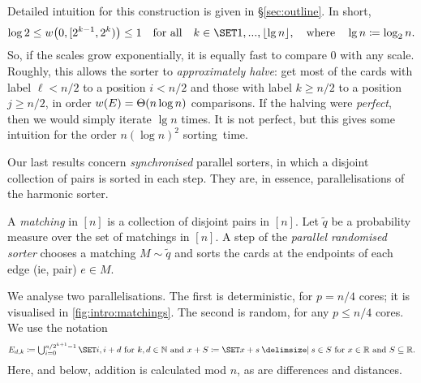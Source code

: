 \documentclass{article}
\begin{document}
\begin{rmkt}
\label{rmk:intro:harm}
Detailed intuition for this construction is given in \S\ref{sec:outline}.
In short,
\[
	\log 2
\le
	w\rbb{ 0, \coi{2^{k-1}, 2^k} }
\le
	1
\Qforall
	k \in \set{1, ..., \floor{\lg n}},
\Qwhere
	\lg n \cq \log_2 n.
\]
So, if the scales grow exponentially, it is equally fast to compare $0$ with any scale.
Roughly, this allows the sorter to \textit{approximately halve}:
	get most of the cards with label $\ell < n/2$ to a position $i < n/2$ and those with label $k \ge n/2$ to a position $j \ge n/2$, in order $w(E) = \Theta( n \log n )$ comparisons.
If the halving were \textit{perfect}, then we would simply iterate $\lg n$ times.
It is not perfect, but this gives some intuition for the order $n (\log n)^2$ sorting~time.
\end{rmkt}


Our last results concern \emph{synchronised} parallel sorters, in which a disjoint collection of pairs is sorted in each step. They are, in essence, parallelisations of the harmonic sorter.

\begin{defn}
\label{def:intro:par}
A \textit{matching} in $[n]$ is a collection of disjoint pairs in $[n]$.
Let $\tilde q$ be a probability measure over the set of matchings in $[n]$.
A step of the \textit{parallel randomised sorter} chooses a matching $M \sim \tilde q$ and sorts the cards at the endpoints of each edge (ie, pair) $e \in M$.
\end{defn}

We analyse two parallelisations.
	The first is deterministic, for $p = n/4$ cores; it is visualised in \cref{fig:intro:matchings}.
	The second is random, for any $p \le n/4$ cores.
We use the notation
\[
\textstyle
	E_{d,k}
\cq
	\bigcup_{i=0}^{n/2^{k+1}-1}
	\set{i, i + d}
\text{ for }
	k, d \in \mbn
\Qand
	x + S
\cq
	\set{ x + s \given s \in S }
\text{ for }
	x \in \mbr
\text{ and }
	S \subseteq \mbr.
\]
Here, and below, addition is calculated mod $n$, as are differences and distances.
\end{document}
